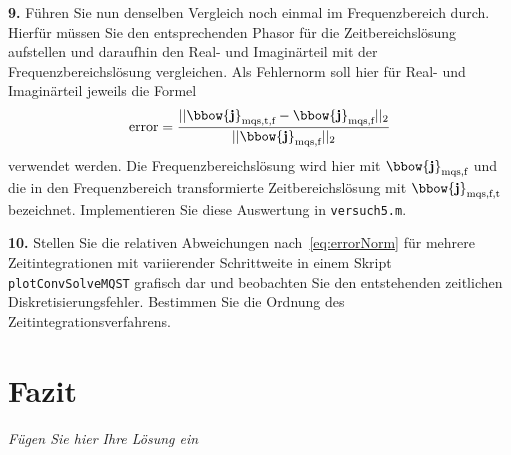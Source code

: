 \documentclass[Protokollheft.tex]{subfiles}
\begin{document}
\begin{framed}
	\noindent \textbf{9.} Führen Sie nun denselben Vergleich noch einmal im Frequenzbereich durch. Hierfür müssen Sie den entsprechenden Phasor für die Zeitbereichslösung aufstellen und daraufhin den Real- und Imaginärteil mit der Frequenzbereichslösung vergleichen. Als Fehlernorm soll hier für Real- und Imaginärteil jeweils die Formel
    \begin{equation}
        \text{error} = \frac{||\bbow{\mathbf{j}}_\text{mqs,t,f}-\bbow{\mathbf{j}}_\text{mqs,f}||_2}{||\bbow{\mathbf{j}}_\text{mqs,f}||_2}
    \end{equation}
    verwendet werden. Die Frequenzbereichslösung wird hier mit $\bbow{\mathbf{j}}_\text{mqs,f}$ und die in den Frequenzbereich transformierte Zeitbereichslösung mit $\bbow{\mathbf{j}}_\text{mqs,f,t}$ bezeichnet. Implementieren Sie diese Auswertung in \lstinline{versuch5.m}.\label{exer:compareFreqVStimeInFreq}
\end{framed}


  \begin{framed}
	\noindent \textbf{10.} Stellen Sie die relativen Abweichungen nach~\eqref{eq:errorNorm} für mehrere Zeitintegrationen mit
      variierender Schrittweite in einem Skript \lstinline{plotConvSolveMQST} grafisch dar und beobachten Sie den entstehenden zeitlichen Diskretisierungsfehler. Bestimmen Sie die Ordnung des Zeitintegrationsverfahrens.\label{exer:relDiffMQSFvsMQST}
\end{framed}





\section{Fazit}
\emph{Fügen Sie hier Ihre Lösung ein}
\end{document}
